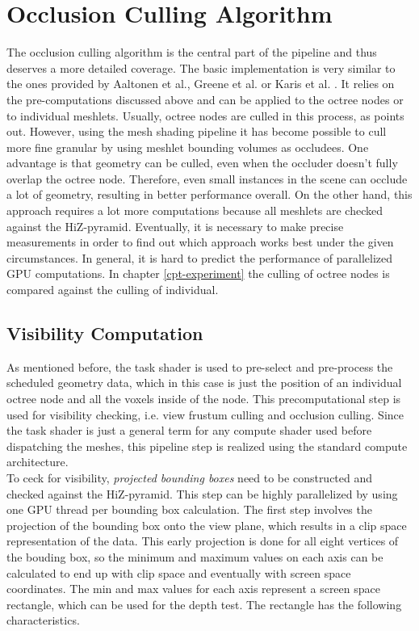 \section{Occlusion Culling Algorithm} \label{sec-occlusion}

The occlusion culling algorithm is the central part of the pipeline and thus deserves a more detailed coverage. The 
basic implementation is very similar to the ones provided by Aaltonen et al., Greene et al. or Karis et al. 
\cite{Aaltonen2015,Greene93,Karis2021}. It relies on the pre-computations discussed above and can be applied to the 
octree nodes or to individual meshlets. Usually, octree nodes are culled in this process, as \cite{AkenineMoeller2018}
points out. However, using the mesh shading pipeline it has become possible to cull more fine granular by using 
meshlet bounding volumes as occludees. One advantage is that geometry can be culled, even when the occluder doesn't 
fully overlap the octree node. Therefore, even small instances in the scene can occlude a lot of geometry, resulting 
in better performance overall. On the other hand, this approach requires a lot more computations because all meshlets 
are checked against the \ac{HiZ}-pyramid. Eventually, it is necessary to make precise measurements in order to find out 
which approach works best under the given circumstances. In general, it is hard to predict the performance of 
parallelized \ac{GPU} computations. In chapter \ref{cpt-experiment} the culling of octree nodes is compared against the 
culling of individual.


\subsection*{Visibility Computation} \label{subsec-visibility-computation}

As mentioned before, the task shader is used to pre-select and pre-process the scheduled geometry data, 
which in this case is just the position of an individual octree node and all the voxels inside of the node. 
This precomputational step is used for visibility checking, i.e. view frustum culling and occlusion culling. 
Since the task shader is just a general term for any compute shader used before dispatching the meshes, 
this pipeline step is realized using the standard compute architecture. \\

To ceck for visibility, \emph{projected bounding boxes} need to be constructed and checked against the 
\ac{HiZ}-pyramid. This step can be highly parallelized by using one \ac{GPU} thread per bounding box 
calculation. The first step involves the projection of the bounding box onto the view plane, which results 
in a clip space representation of the data. This early projection is done for all eight vertices of the 
bouding box, so the minimum and maximum values on each axis can be calculated to end up with clip space 
and eventually with screen space coordinates. The min and max values for each axis represent a screen 
space rectangle, which can be used for the depth test. The rectangle has the following characteristics.

